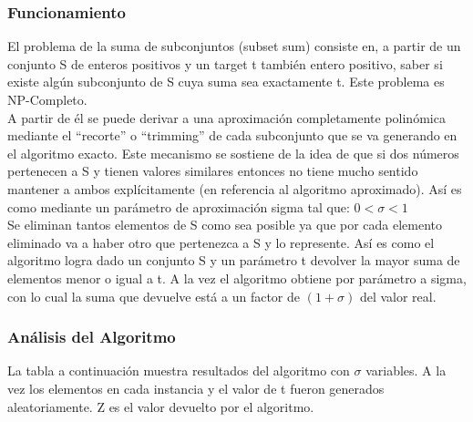 \documentclass[a4paper, 10pt]{article}
\newcommand\tab[1][0.5cm]{\hspace*{#1}}
\begin{document}
            \subsubsection{Funcionamiento}
                \tab El problema de la suma de subconjuntos (subset sum) consiste en, a partir de un conjunto S de enteros
                positivos y un target t también entero positivo, saber si existe algún subconjunto de S cuya suma sea
                exactamente t. Este problema es NP-Completo.\\
                \tab A partir de él se puede derivar a una aproximación completamente polinómica mediante el “recorte” o
                “trimming” de cada subconjunto que se va generando en el algoritmo exacto. Este mecanismo se sostiene de
                la idea de que si dos números pertenecen a S y tienen valores similares entonces no tiene mucho sentido
                mantener a ambos explícitamente (en referencia al algoritmo aproximado). Así es como mediante un parámetro
                de aproximación sigma tal que:
                                                            $0 < \sigma < 1$ \\
                \tab Se eliminan tantos elementos de S como sea posible ya que por cada elemento eliminado va a haber otro
                que pertenezca a S y lo represente. Así es como el algoritmo logra dado un conjunto S y un parámetro t
                devolver la mayor suma de elementos menor o igual a t. A la vez el algoritmo obtiene por parámetro a sigma,
                con lo cual la suma que devuelve está a un factor de $(1 + \sigma)$ del valor real.\\
            \subsubsection{Análisis del Algoritmo}
                \tab La tabla a continuación muestra resultados del algoritmo con $\sigma$ variables. A la vez los elementos
                en cada instancia y el valor de t fueron generados aleatoriamente. Z es el valor devuelto por el algoritmo.
\end{document}
